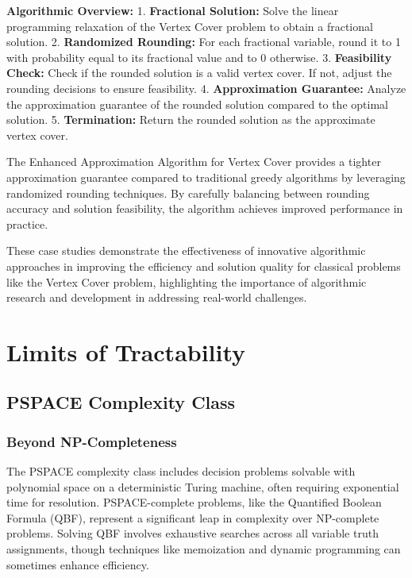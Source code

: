 \textbf{Algorithmic Overview:} 
1. \textbf{Fractional Solution:} Solve the linear programming relaxation of the Vertex Cover problem to obtain a fractional solution.
2. \textbf{Randomized Rounding:} For each fractional variable, round it to 1 with probability equal to its fractional value and to 0 otherwise.
3. \textbf{Feasibility Check:} Check if the rounded solution is a valid vertex cover. If not, adjust the rounding decisions to ensure feasibility.
4. \textbf{Approximation Guarantee:} Analyze the approximation guarantee of the rounded solution compared to the optimal solution.
5. \textbf{Termination:} Return the rounded solution as the approximate vertex cover.

\FloatBarrier
The Enhanced Approximation Algorithm for Vertex Cover provides a tighter approximation guarantee compared to traditional greedy algorithms by leveraging randomized rounding techniques. By carefully balancing between rounding accuracy and solution feasibility, the algorithm achieves improved performance in practice.

These case studies demonstrate the effectiveness of innovative algorithmic approaches in improving the efficiency and solution quality for classical problems like the Vertex Cover problem, highlighting the importance of algorithmic research and development in addressing real-world challenges.


\section{Limits of Tractability}

\subsection{PSPACE Complexity Class}

\subsubsection{Beyond NP-Completeness}

The PSPACE complexity class includes decision problems solvable with polynomial space on a deterministic Turing machine, often requiring exponential time for resolution. PSPACE-complete problems, like the Quantified Boolean Formula (QBF), represent a significant leap in complexity over NP-complete problems. Solving QBF involves exhaustive searches across all variable truth assignments, though techniques like memoization and dynamic programming can sometimes enhance efficiency.

